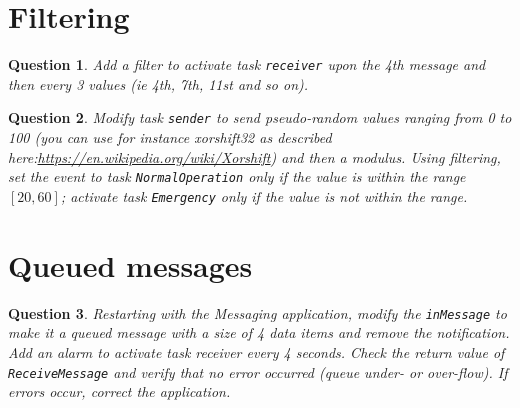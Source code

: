 \documentclass[11pt]{report}
\newtheorem{ex}{Question}
\newcommand{\unixcl}[1]{\texttt{\fcolorbox{black}{gray!20}{\footnotesize#1}}}
\begin{document}
\section{Filtering}

\begin{ex}
Add a filter to activate task \texttt{receiver} upon the 4th message and then every 3 values (ie 4th, 7th, 11st and so on).
\end{ex}

\begin{ex}
    Modify task \texttt{sender} to send  pseudo-random values ranging from 0 to 100 (you can use for instance xorshift32 as described here:\url{https://en.wikipedia.org/wiki/Xorshift}) and then a modulus.
    Using filtering, set the event to task \texttt{NormalOperation} only if the value is within the range $[20,60]$; activate task \texttt{Emergency} only if the value is not within the range.
\end{ex}

\section{Queued messages}


\begin{ex}
    Restarting with the Messaging application, modify the \texttt{inMessage} to make it a queued message with a size of 4 data items and remove the notification. Add an alarm to activate task receiver every 4 seconds. Check the return value of \texttt{ReceiveMessage} and verify that no error occurred (queue under- or over-flow). If errors occur, correct the application.
\end{ex}






\end{document}
